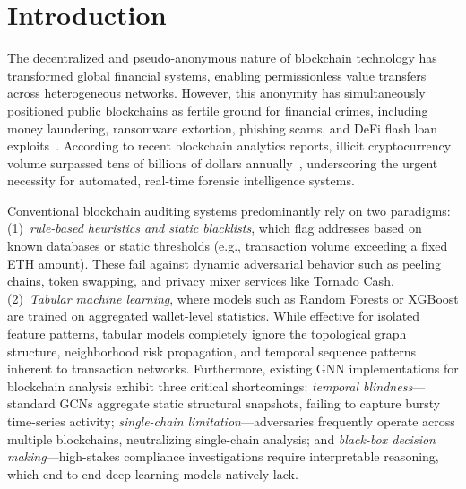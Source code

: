 \documentclass[conference]{IEEEtran}
\begin{document}
\section{Introduction}
\label{sec:intro}

The decentralized and pseudo-anonymous nature of blockchain technology has transformed global financial systems, enabling permissionless value transfers across heterogeneous networks. However, this anonymity has simultaneously positioned public blockchains as fertile ground for financial crimes, including money laundering, ransomware extortion, phishing scams, and DeFi flash loan exploits~\cite{weber2019aml}. According to recent blockchain analytics reports, illicit cryptocurrency volume surpassed tens of billions of dollars annually~\cite{chainalysis2024}, underscoring the urgent necessity for automated, real-time forensic intelligence systems.

Conventional blockchain auditing systems predominantly rely on two paradigms: (1)~\textit{rule-based heuristics and static blacklists}, which flag addresses based on known databases or static thresholds (e.g., transaction volume exceeding a fixed ETH amount). These fail against dynamic adversarial behavior such as peeling chains, token swapping, and privacy mixer services like Tornado Cash. (2)~\textit{Tabular machine learning}, where models such as Random Forests or XGBoost are trained on aggregated wallet-level statistics. While effective for isolated feature patterns, tabular models completely ignore the topological graph structure, neighborhood risk propagation, and temporal sequence patterns inherent to transaction networks. Furthermore, existing GNN implementations for blockchain analysis exhibit three critical shortcomings: \textit{temporal blindness}---standard GCNs aggregate static structural snapshots, failing to capture bursty time-series activity; \textit{single-chain limitation}---adversaries frequently operate across multiple blockchains, neutralizing single-chain analysis; and \textit{black-box decision making}---high-stakes compliance investigations require interpretable reasoning, which end-to-end deep learning models natively lack.
\end{document}
